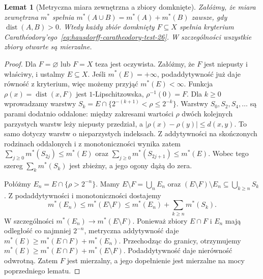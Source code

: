 \documentclass[11pt,a4paper,oneside]{book}
\numberwithin{equation}{chapter}
\theoremstyle{plain}
\newtheorem{lemat}[twierdzenie]{Lemat}
\theoremstyle{definition}
\theoremstyle{remark}
\begin{document}
\begin{lemat}[Metryczna miara zewnętrzna a zbiory domknięte]
\label{lem:hausdorff-metric-open-26}
Załóżmy, że miara zewnętrzna $m^*$ spełnia
$m^*(A\cup B)=m^*(A)+m^*(B)$ zawsze, gdy
$\operatorname{dist}(A,B)>0$. Wtedy każdy zbiór
domknięty $F\subseteq X$ spełnia kryterium
Carathéodory'ego~\eqref{eq:hausdorff-caratheodory-test-26}.
W szczególności wszystkie zbiory otwarte są mierzalne.
\end{lemat}
\begin{proof}
Dla $F=\varnothing$ lub $F=X$ teza jest oczywista.
Załóżmy, że $F$ jest niepusty i właściwy, i ustalmy
$E\subseteq X$. Jeśli $m^*(E)=+\infty$,
podaddytywność już daje równość z kryterium,
więc możemy przyjąć $m^*(E)<\infty$.
Funkcja $\rho(x)=\operatorname{dist}(x,F)$
jest $1$-Lipschitzowska, $\rho^{-1}(0)=F$.
Dla $k\ge0$ wprowadzamy warstwy
$S_k=E\cap\{2^{-(k+1)}<\rho\leq2^{-k}\}$.
Warstwy $S_0,S_2,S_4,\ldots$ są parami dodatnio
oddalone: między zakresami wartości $\rho$ dwóch
kolejnych parzystych warstw leży niepusty przedział,
a $|\rho(x)-\rho(y)|\leq d(x,y)$.
To samo dotyczy warstw o nieparzystych indeksach.
Z addytywności na skończonych rodzinach oddalonych
i z monotoniczności wynika zatem
$\sum_{j\ge0}m^*(S_{2j})\leq m^*(E)$ oraz
$\sum_{j\ge0}m^*(S_{2j+1})\leq m^*(E)$.
Wobec tego szereg $\sum_km^*(S_k)$ jest zbieżny,
a jego ogony dążą do zera.

Połóżmy $E_n=E\cap\{\rho>2^{-n}\}$. Mamy
$E\setminus F=\bigcup_nE_n$ oraz
$(E\setminus F)\setminus E_n\subseteq\bigcup_{k\ge n}S_k$.
Z podaddytywności i monotoniczności dostajemy
\[
 m^*(E_n)\leq m^*(E\setminus F)
 \leq m^*(E_n)+\sum_{k\ge n}m^*(S_k).
\]
W szczególności $m^*(E_n)\to m^*(E\setminus F)$.
Ponieważ zbiory $E\cap F$ i $E_n$ mają odległość
co najmniej $2^{-n}$, metryczna addytywność daje
$m^*(E)\geq m^*(E\cap F)+m^*(E_n)$.
Przechodząc do granicy, otrzymujemy
$m^*(E)\geq m^*(E\cap F)+m^*(E\setminus F)$.
Podaddytywność daje nierówność odwrotną.
Zatem $F$ jest mierzalny, a jego dopełnienie
jest mierzalne na mocy poprzedniego lematu.
\end{proof}
\end{document}
